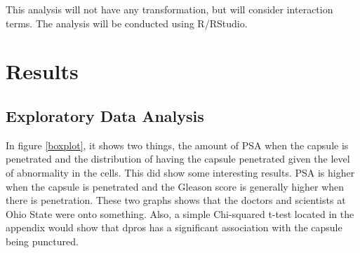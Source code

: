 \documentclass{article}\usepackage[]{graphicx}\usepackage[]{color}
\begin{document}
\qquad This analysis will not have any transformation, but will consider interaction terms. 
The analysis will be conducted using R/RStudio. 


\section{Results}
\subsection{Exploratory Data Analysis}

\qquadIn In figure \ref{boxplot}, it shows two things, the amount of PSA when the capsule is penetrated and the distribution of having the capsule penetrated given the level of abnormality in the cells. This did show some interesting results. PSA is higher when the capsule is penetrated and the Gleason score is generally higher when there is penetration. These two graphs shows that the doctors and scientists at Ohio State were onto something. Also, a simple Chi-squared t-test located in the appendix would show that dpros has a significant association with the capsule being punctured.
\end{document}
